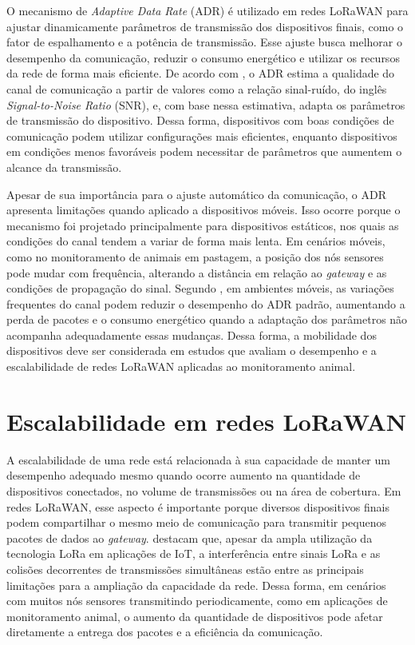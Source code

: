 O mecanismo de \textit{Adaptive Data Rate} (ADR) é utilizado em redes LoRaWAN para ajustar dinamicamente parâmetros de transmissão dos dispositivos finais, como o fator de espalhamento e a potência de transmissão. Esse ajuste busca melhorar o desempenho da comunicação, reduzir o consumo energético e utilizar os recursos da rede de forma mais eficiente. De acordo com , o ADR estima a qualidade do canal de comunicação a partir de valores como a relação sinal-ruído, do inglês \textit{Signal-to-Noise Ratio} (SNR), e, com base nessa estimativa, adapta os parâmetros de transmissão do dispositivo. Dessa forma, dispositivos com boas condições de comunicação podem utilizar configurações mais eficientes, enquanto dispositivos em condições menos favoráveis podem necessitar de parâmetros que aumentem o alcance da transmissão.

Apesar de sua importância para o ajuste automático da comunicação, o ADR apresenta limitações quando aplicado a dispositivos móveis. Isso ocorre porque o mecanismo foi projetado principalmente para dispositivos estáticos, nos quais as condições do canal tendem a variar de forma mais lenta. Em cenários móveis, como no monitoramento de animais em pastagem, a posição dos nós sensores pode mudar com frequência, alterando a distância em relação ao \textit{gateway} e as condições de propagação do sinal. Segundo , em ambientes móveis, as variações frequentes do canal podem reduzir o desempenho do ADR padrão, aumentando a perda de pacotes e o consumo energético quando a adaptação dos parâmetros não acompanha adequadamente essas mudanças. Dessa forma, a mobilidade dos dispositivos deve ser considerada em estudos que avaliam o desempenho e a escalabilidade de redes LoRaWAN aplicadas ao monitoramento animal.

\section{Escalabilidade em redes LoRaWAN}
\label{sec:escalabilidade-lorawan}

A escalabilidade de uma rede está relacionada à sua capacidade de manter um desempenho adequado mesmo quando ocorre aumento na quantidade de dispositivos conectados, no volume de transmissões ou na área de cobertura. Em redes LoRaWAN, esse aspecto é importante porque diversos dispositivos finais podem compartilhar o mesmo meio de comunicação para transmitir pequenos pacotes de dados ao \textit{gateway}.  destacam que, apesar da ampla utilização da tecnologia LoRa em aplicações de IoT, a interferência entre sinais LoRa e as colisões decorrentes de transmissões simultâneas estão entre as principais limitações para a ampliação da capacidade da rede. Dessa forma, em cenários com muitos nós sensores transmitindo periodicamente, como em aplicações de monitoramento animal, o aumento da quantidade de dispositivos pode afetar diretamente a entrega dos pacotes e a eficiência da comunicação.

